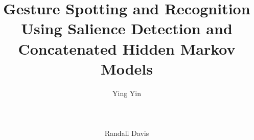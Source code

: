 \documentclass{sig-alternate-2013}
\begin{document}
%

\title{Gesture Spotting and Recognition Using Salience
Detection and Concatenated Hidden Markov Models}
%
%
%
%
%

%
\author{
%
%
\alignauthor
Ying Yin\\
       \\
       \affaddr{}\\
       \affaddr{}\\
\alignauthor
Randall Davis \\
       \\
       \affaddr{}\\
       \affaddr{}\\
}
\end{document}
